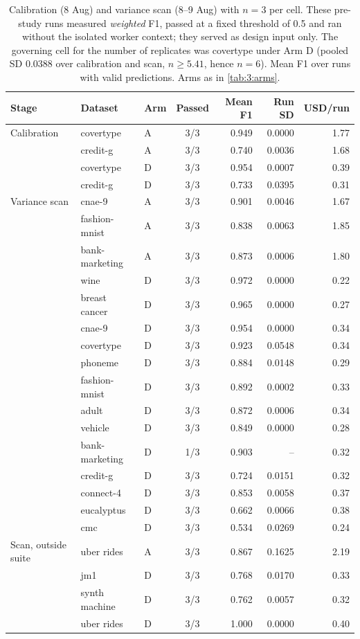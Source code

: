 \begin{table}[htbp]
  \centering
  \small
  \caption[Calibration and variance scan]{Calibration (8 Aug) and variance scan (8--9 Aug) with $n = 3$ per cell. These pre-study runs measured \emph{weighted} F1, passed at a fixed threshold of 0.5 and ran without the isolated worker context; they served as design input only. The governing cell for the number of replicates was covertype under Arm D (pooled SD 0.0388 over calibration and scan, \mbox{$n \geq 5.41$}, hence $n = 6$). Mean F1 over runs with valid predictions. Arms as in \autoref{tab:3:arms}.}
  \label{tab:5:calibration}
  \begin{tabular}{lllcrrr}
    \toprule
    Stage & Dataset & Arm & Passed & Mean F1 & Run SD & USD/run \\
    \midrule
    Calibration & covertype & A & 3/3 & 0.949 & 0.0000 & 1.77 \\
     & credit-g & A & 3/3 & 0.740 & 0.0036 & 1.68 \\
     & covertype & D & 3/3 & 0.954 & 0.0007 & 0.39 \\
     & credit-g & D & 3/3 & 0.733 & 0.0395 & 0.31 \\
    \midrule
    Variance scan & cnae-9 & A & 3/3 & 0.901 & 0.0046 & 1.67 \\
     & fashion-mnist & A & 3/3 & 0.838 & 0.0063 & 1.85 \\
     & bank-marketing & A & 3/3 & 0.873 & 0.0006 & 1.80 \\
     & wine & D & 3/3 & 0.972 & 0.0000 & 0.22 \\
     & breast cancer & D & 3/3 & 0.965 & 0.0000 & 0.27 \\
     & cnae-9 & D & 3/3 & 0.954 & 0.0000 & 0.34 \\
     & covertype & D & 3/3 & 0.923 & 0.0548 & 0.34 \\
     & phoneme & D & 3/3 & 0.884 & 0.0148 & 0.29 \\
     & fashion-mnist & D & 3/3 & 0.892 & 0.0002 & 0.33 \\
     & adult & D & 3/3 & 0.872 & 0.0006 & 0.34 \\
     & vehicle & D & 3/3 & 0.849 & 0.0000 & 0.28 \\
     & bank-marketing & D & 1/3 & 0.903 & -- & 0.32 \\
     & credit-g & D & 3/3 & 0.724 & 0.0151 & 0.32 \\
     & connect-4 & D & 3/3 & 0.853 & 0.0058 & 0.37 \\
     & eucalyptus & D & 3/3 & 0.662 & 0.0066 & 0.38 \\
     & cmc & D & 3/3 & 0.534 & 0.0269 & 0.24 \\
    \midrule
    Scan, outside suite & uber rides & A & 3/3 & 0.867 & 0.1625 & 2.19 \\
     & jm1 & D & 3/3 & 0.768 & 0.0170 & 0.33 \\
     & synth machine & D & 3/3 & 0.762 & 0.0057 & 0.32 \\
     & uber rides & D & 3/3 & 1.000 & 0.0000 & 0.40 \\
    \bottomrule
  \end{tabular}
\end{table}
